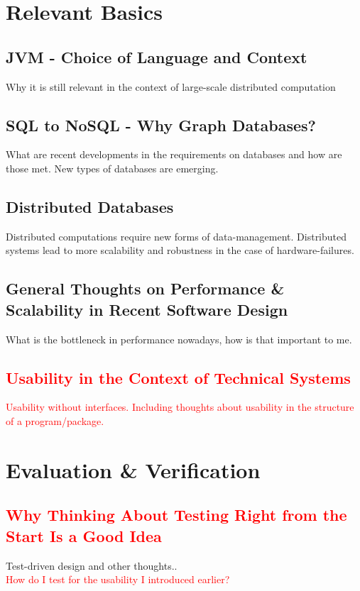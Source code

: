 \documentclass[12p]{scrartcl}
\begin{document}
\section{Relevant Basics}
\subsection{JVM - Choice of Language and Context}
Why it is still relevant in the context of large-scale distributed computation
\subsection{SQL to NoSQL - Why Graph Databases?}
What are recent developments in the requirements on databases and how are those met. New types of databases are emerging.
\subsection{Distributed Databases}
Distributed computations require new forms of data-management. Distributed systems lead to more scalability and robustness in the case of hardware-failures.
\subsection{General Thoughts on Performance \& Scalability in Recent Software Design}
What is the bottleneck in performance nowadays, how is that important to me.

\subsection{\textcolor{red}{Usability in the Context of Technical Systems}}
\textcolor{red}{Usability without interfaces. Including thoughts about usability in the structure of a program/package.}



\section{Evaluation \& Verification}
\subsection{\textcolor{red}{Why Thinking About Testing Right from the Start Is a Good Idea}}
Test-driven design and other thoughts..\\
\textcolor{red}{How do I test for the usability I introduced earlier?}
\end{document}
